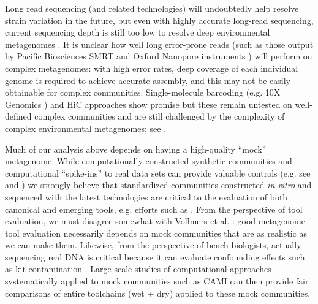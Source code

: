 \documentclass[11pt]{article}
\begin{document}
Long read sequencing (and related technologies) will undoubtedly help
resolve strain variation in the future, but even with highly accurate
long-read sequencing, current sequencing depth is still too low to
resolve deep environmental metagenomes \cite{Sharon2015,White2016}.
It is unclear how well long error-prone reads (such as those output by
Pacific Biosciences SMRT \cite{Eid2009} and Oxford Nanopore
instruments \cite{Cherf2012}) will perform on complex metagenomes:
with high error rates, deep coverage of each individual genome is
required to achieve accurate assembly, and this may not be easily
obtainable for complex communities.  Single-molecule barcoding
(e.g. 10X Genomics \cite{Moss125211}) and HiC approaches
\cite{SmukowskiHeil150722} show promise but these remain untested on
well-defined complex communities and are still challenged by the
complexity of complex environmental metagenomes; see
\cite{Burton2014,Marbouty2014,Beitel2014}.

Much of our analysis above depends on having a high-quality ``mock''
metagenome.  While computationally constructed synthetic communities
and computational ``spike-ins'' to real data sets can provide valuable
controls (e.g. see \cite{metag_one} and \cite{ahowe2014}) we strongly
believe that standardized communities constructed {\em in vitro} and
sequenced with the latest technologies are critical to the evaluation
of both canonical and emerging tools, e.g. efforts such as
\cite{Brown2017}. From the perspective of tool evaluation, we must
disagree somewhat with Vollmers et al. \cite{Vollmers2017}: good
metagenome tool evaluation necessarily depends on mock communities
that are as realistic as we can make them.  Likewise, from the
perspective of bench biologists, actually sequencing real DNA is
critical because it can evaluate confounding effects such as kit
contamination \cite{Salter2014}.  Large-scale studies of computational
approaches systematically applied to mock communities such as CAMI
\cite{CAMI} can then provide fair comparisons of entire toolchains
(wet + dry) applied to these mock communities.

\end{document}
